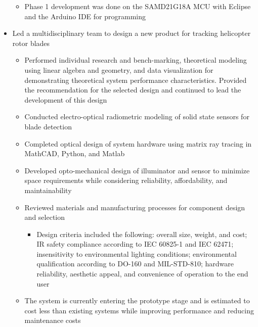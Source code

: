 \documentclass[10pt,a4paper]{article}
\begin{document}
\begin{itemize}
\begin{itemize}
      \item Phase 1 development was done on the SAMD21G18A MCU with Eclipse and the
        Arduino IDE for programming
    \end{itemize}

  \item Led a multidisciplinary team to design a new product for tracking helicopter
    rotor blades

  \begin{itemize}
    \item Performed individual research and bench-marking, theoretical modeling using
      linear algebra and geometry, and data visualization for demonstrating theoretical
      system performance characteristics. Provided the recommendation for the selected
      design and continued to lead the development of this design

    \item Conducted electro-optical radiometric modeling of solid state sensors for
      blade detection

    \item Completed optical design of system hardware using matrix ray tracing in
      MathCAD, Python, and Matlab

    \item Developed opto-mechanical design of illuminator and sensor to
      minimize space requirements while considering reliability, affordability, and
      maintainability

    \item Reviewed materials and manufacturing processes for component design and
      selection

    \begin{itemize}
      \item Design criteria included the following: overall size, weight, and cost; IR
        safety compliance according to IEC 60825-1 and IEC 62471; insensitivity to
        environmental lighting conditions; environmental qualification according to
        DO-160 and MIL-STD-810; hardware reliability, aesthetic appeal, and convenience
        of operation to the end user
    \end{itemize}

    \item The system is currently entering the prototype stage and is estimated to cost less than
      existing systems while improving performance and reducing maintenance costs
  \end{itemize}


\end{itemize}
\end{document}
